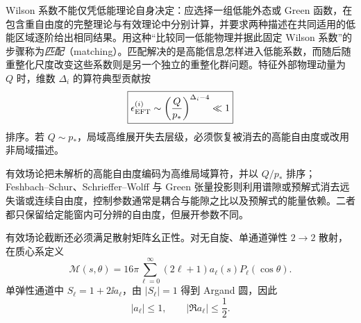 Wilson 系数不能仅凭低能理论自身决定：应选择一组低能外态或 Green 函数，在包含重自由度的完整理论与有效理论中分别计算，并要求两种描述在共同适用的低能区域逐阶给出相同结果。用这种“比较同一低能物理并据此固定 Wilson 系数”的步骤称为\emph{匹配}（matching）。匹配解决的是高能信息怎样进入低能系数，而随后随重整化尺度改变这些系数则是另一个独立的重整化群问题。特征外部物理动量为 \(Q\) 时，维数 \(\Delta_i\) 的算符典型贡献按
\begin{equation}
 \boxed{
 \epsilon_{\rm EFT}^{(i)}
 \sim
 \left(\frac{Q}{p_*}\right)^{\Delta_i-4}
 \ll1}
 \label{eq:eft-power-counting-dp10}
\end{equation}
排序。若 \(Q\sim p_*\)，局域高维展开失去层级，必须恢复被消去的高能自由度或改用非局域描述。

有效场论把未解析的高能自由度编码为高维局域算符，并以 \(Q/p_*\) 排序；Feshbach--Schur、Schrieffer--Wolff 与 Green 张量投影则利用谱隙或预解式消去远失谐或连续自由度，控制参数通常是耦合与能隙之比以及预解式的能量依赖。二者都只保留给定能窗内可分辨的自由度，但展开参数不同。


有效场论截断还必须满足散射矩阵幺正性。对无自旋、单通道弹性 \(2\to2\) 散射，在质心系定义
\begin{equation}
 \boxed{
 \mathcal M(s,\theta)
 =16\pi\sum_{\ell=0}^{\infty}(2\ell+1)
 a_\ell(s)P_\ell(\cos\theta).}
 \label{eq:partial-wave-expansion-dp10}
\end{equation}
单弹性通道中 \(S_\ell=1+2\ii a_\ell\)，由 \(|S_\ell|=1\) 得到 Argand 圆，因此
\begin{equation}
 \boxed{
 |a_\ell|\le1,
 \qquad
 |\Re a_\ell|\le\frac12.}
 \label{eq:partial-wave-unitarity-bound-dp10}
\end{equation}

